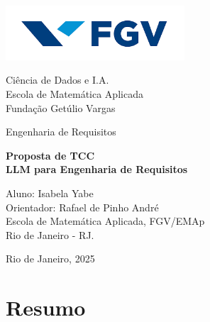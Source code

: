 \documentclass[12pt,a4paper]{article}
\begin{document}
\begin{titlepage}
    \begin{center}
        \vspace*{0cm}
        
            \includegraphics[width=0.5\textwidth]{Images/Logo_FGV.png} 
            
        \vspace{1.5cm}
        \large
        
        Ciência de Dados e I.A.\\
        Escola de Matemática Aplicada\\
        Fundação Getúlio Vargas\\

        \vspace{1cm}  
    
        \Large
        Engenharia de Requisitos
            
        \vspace{2cm}
        
        \vspace{0.25cm}

        \Huge \textbf{Proposta de TCC} \\ 
        \vspace{0.5cm}
        \huge \textbf{LLM para Engenharia de Requisitos}
        \vspace{3.6cm}
        
        \large
                Aluno: Isabela Yabe\\
                Orientador: Rafael de Pinho André\\
                Escola de Matemática Aplicada, FGV/EMAp \\
                Rio de Janeiro - RJ.
        \vfill
            
        \vspace{0.8cm}  
        
        Rio de Janeiro, 2025
            
    \end{center}
\end{titlepage}

\newpage
\tableofcontents

\newpage
\section{Resumo}
\end{document}
